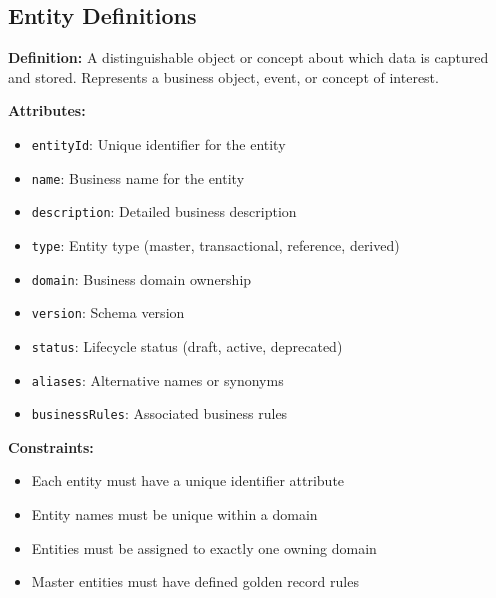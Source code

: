 \documentclass[11pt,letterpaper]{article}
\begin{document}
\subsection{Entity Definitions}

\begin{definitionbox}
\textbf{Definition:} A distinguishable object or concept about which data is captured and stored. Represents a business object, event, or concept of interest.

\textbf{Attributes:}
\begin{itemize}[nosep]
    \item \texttt{entityId}: Unique identifier for the entity
    \item \texttt{name}: Business name for the entity
    \item \texttt{description}: Detailed business description
    \item \texttt{type}: Entity type (master, transactional, reference, derived)
    \item \texttt{domain}: Business domain ownership
    \item \texttt{version}: Schema version
    \item \texttt{status}: Lifecycle status (draft, active, deprecated)
    \item \texttt{aliases}: Alternative names or synonyms
    \item \texttt{businessRules}: Associated business rules
\end{itemize}

\textbf{Constraints:}
\begin{itemize}[nosep]
    \item Each entity must have a unique identifier attribute
    \item Entity names must be unique within a domain
    \item Entities must be assigned to exactly one owning domain
    \item Master entities must have defined golden record rules
\end{itemize}
\end{definitionbox}
\end{document}
